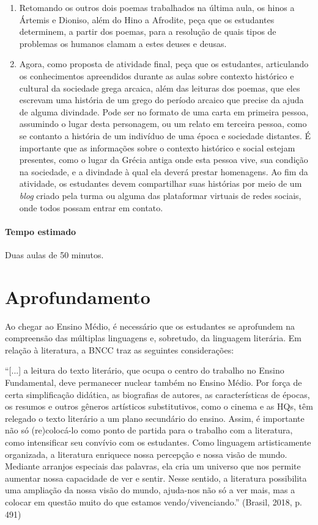 \documentclass[12pt]{extarticle}
\begin{document}
\begin{enumerate}

	\item
	Retomando os outros dois poemas trabalhados na última aula, os hinos a 
	Ártemis e Dioniso, além do Hino a Afrodite, peça que os estudantes 
	determinem, a partir dos poemas, para a resolução de quais tipos de 
	problemas os humanos clamam a estes deuses e deusas. 

	\item
	Agora, como proposta de atividade final, peça que os estudantes, articulando
	os conhecimentos apreendidos durante as aulas sobre contexto histórico e cultural
	da sociedade grega arcaica, além das leituras dos poemas, que eles escrevam 
	uma história de um grego do período arcaico que precise da ajuda de alguma
	divindade. Pode ser no formato de uma carta em primeira pessoa, assumindo o lugar
	desta personagem, ou um relato em terceira pessoa, como se contanto a história
	de um indivíduo de uma época e sociedade distantes. É importante que as informações 
	sobre o contexto histórico e social estejam presentes, como o lugar da Grécia antiga 
	onde esta pessoa vive, sua condição na sociedade, e a divindade à qual ela deverá
	prestar homenagens. 
	Ao fim da atividade, os estudantes devem compartilhar suas histórias por meio de um
	\textit{blog} criado pela turma ou alguma das plataformar virtuais de redes sociais,
	onde todos possam entrar em contato.


\end{enumerate}

\paragraph{Tempo estimado} Duas aulas de 50 minutos.




\section{Aprofundamento}


Ao chegar ao Ensino Médio, é necessário que os estudantes se aprofundem
na compreensão das múltiplas linguagens e, sobretudo, da linguagem
literária. Em relação à literatura, a BNCC traz as seguintes
considerações:

``{[}...{]} a leitura do texto literário, que ocupa o centro do trabalho
no Ensino Fundamental, deve permanecer nuclear também no Ensino Médio.
Por força de certa simplificação didática, as biografias de autores, as
características de épocas, os resumos e outros gêneros artísticos
substitutivos, como o cinema e as HQs, têm relegado o texto literário a
um plano secundário do ensino. Assim, é importante não só (re)colocá-lo
como ponto de partida para o trabalho com a literatura, como
intensificar seu convívio com os estudantes. Como linguagem
artisticamente organizada, a literatura enriquece nossa percepção e
nossa visão de mundo. Mediante arranjos especiais das palavras, ela cria
um universo que nos permite aumentar nossa capacidade de ver e sentir.
Nesse sentido, a literatura possibilita uma ampliação da nossa visão do
mundo, ajuda-nos não só a ver mais, mas a colocar em questão muito do
que estamos vendo/vivenciando.'' (Brasil, 2018, p. 491)
\end{document}
